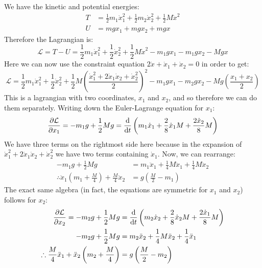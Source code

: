 \documentclass[10pt]{article}
\begin{document}
\begin{enumerate}[(a)]
        \begin{solution}
            We have the kinetic and potential energies:
            \begin{align*}
                T &= \frac 12 m_1\dot x_1^2 + \frac 12 m_2 \dot x_2^2 + \frac 12 M \dot x^2\\
                U &= mgx_1 + mgx_2 + mgx
            \end{align*}
            Therefore the Lagrangian is: 
            \[ \mathcal{L} = T - U = \frac 12 m_1 \dot x_1^2 + \frac 12 \dot x_2^2 + \frac 12 M \dot x^2 - m_1gx_1 - m_1gx_2 - Mgx\] 
            Here we can now use the constraint equation $2\dot x + \dot x_1 + \dot x_2 = 0$ in order to get: 
            \[ \mathcal L = \frac12 m_1 \dot x_1^2 + \frac 12 \dot x_2^2 + \frac 12 M \left(\frac{\dot x_1^2 + 2\dot x_1 \dot x_2 + \dot x_2^2}{2}\right)^2 - m_1gx_1 - m_2gx_2 - Mg\left(\frac{x_1 + x_2}{2}\right)\] 
            This is a lagrangian with two coordinates, $x_1$ and $x_2$, and so therefore we can do them separately. Writing down the Euler-Lagrange equation for $x_1$: 
            \[ \pdv{\mathcal L}{x_1} = -m_1g + \frac 12 Mg = \dv{t}\left( m_1 \dot x_1 + \frac{2}{8} \dot x_1 M + \frac{2\dot x_2}{8} M\right)\]
            We have three terms on the rightmost side here because in the expansion of $\dot x_1^2 + 2\dot x_1 \dot x_2 + \dot x_2^2$ we have two terms containing $\dot x_1$. Now, we can rearrange: 
            \begin{align*}
                -m_1g + \frac 12 Mg &= m_1 \ddot x_1 + \frac 14 M \ddot x_1 + \frac 14 M \ddot x_2\\
                \therefore \ddot x_1\left(m_1 + \frac M4\right) + \frac M4 \ddot x_2 &= g\left( \frac M2 - m_1\right)
            \end{align*} 
            The exact same algebra (in fact, the equations are symmetric for $x_1$ and $x_2$) follows for $x_2$: 
            \begin{align*}
                \pdv{\mathcal L}{x_2} = -m_2g + \frac 12 Mg &= \dv{t}\left(m_2 \dot x_2 + \frac{2}{8} \dot x_2M + \frac{2\dot x_1}{8}M\right)\\
                -m_2g + \frac 12 Mg &= m_2 \ddot x_2 + \frac 14 M \ddot x_2 + \frac 14 \ddot x_1\\
                \therefore  \frac M4 \ddot x_1 + \ddot x_2 \left( m_2 + \frac M4 \right) &= g\left( \frac {M}{2} - m_2\right)
            \end{align*}
        \end{solution}
    \end{enumerate}
\end{document}
